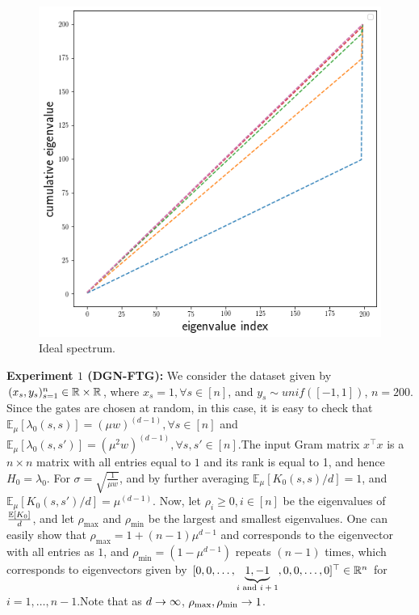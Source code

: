 \begin{figure}
\includegraphics[scale=0.15]{figs/dgn-fra-ecdf-ideal.png}
\caption{Ideal spectrum.}
\label{fig:ideal-spectrum}
\end{figure}
\textbf{Experiment $1$ (DGN-FTG):}  We consider the dataset given by $(x_s,y_s)_{s=1}^n\in \mathbb{R}\times \mathbb{R}$, where $x_s=1,\forall s\in [n]$, and $y_s\sim unif([-1,1])$, $n=200$. Since the gates are chosen at random, in this case, it is easy to check that $\mathbb{E}_{\mu}\left[\lambda_0(s,s)\right]=(\mu w)^{(d-1)},\forall s\in[n]$ and $\mathbb{E}_{\mu}\left[\lambda_0(s,s')\right]=(\mu^2 w)^{(d-1)},\forall s,s'\in[n]$.The input Gram matrix $x^\top x$ is a $n\times n$ matrix with all entries equal to $1$ and its rank is equal to 1, and hence $H_0=\lambda_0$.  For $\sigma=\sqrt{\frac{1}{\mu w}}$, and by further averaging $\mathbb{E}_{\mu}\left[K_0(s,s)/d\right]=1$, and $\mathbb{E}_{\mu}\left[K_0(s,s')/d\right]=\mu^{(d-1)}$. Now, let $\rho_i\geq 0,i \in [n]$ be the eigenvalues of $\frac{\mathbb{E}\left[K_0\right]}{d}$, and let $\rho_{\max}$ and $\rho_{\min}$ be the largest and smallest eigenvalues.  One can easily show that $\rho_{\max}=1+(n-1)\mu^{d-1}$ and corresponds to the eigenvector with all entries as $1$, and $\rho_{\min}=(1-\mu^{d-1})$ repeats $(n-1)$ times,  which corresponds to eigenvectors given by $[0, 0, \ldots, \underbrace{1, -1}_{\text{$i$ and $i+1$}}, 0,0,\ldots, 0]^\top \in \mathbb{R}^n$ for $i=1,\ldots,n-1$.\WFclear Note that as $d\rightarrow\infty$, $\rho_{\max},\rho_{\min}\rightarrow 1$.\\
